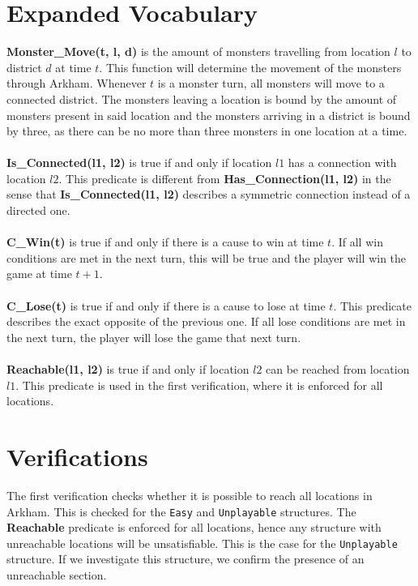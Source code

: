 \documentclass[12pt]{report}
\begin{document}
\section*{Expanded Vocabulary}
\textbf{Monster\_Move(t, l, d)} is the amount of monsters travelling from location $l$ to district $d$ at time $t$. This function will determine the movement of the monsters through Arkham. Whenever $t$ is a monster turn, all monsters will move to a connected district. The monsters leaving a location is bound by the amount of monsters present in said location and the monsters arriving in a district is bound by three, as there can be no more than three monsters in one location at a time.
\\\\
\textbf{Is\_Connected(l1, l2)} is true if and only if location $l1$ has a connection with location $l2$. This predicate is different from \textbf{Has\_Connection(l1, l2)} in the sense that \textbf{Is\_Connected(l1, l2)} describes a symmetric connection instead of a directed one.
\\\\
\textbf{C\_Win(t)} is true if and only if there is a cause to win at time $t$. If all win conditions are met in the next turn, this will be true and the player will win the game at time $t+1$.
\\\\
\textbf{C\_Lose(t)} is true if and only if there is a cause to lose at time $t$. This predicate describes the exact opposite of the previous one. If all lose conditions are met in the next turn, the player will lose the game that next turn.
\\\\
\textbf{Reachable(l1, l2)} is true if and only if location $l2$ can be reached from location $l1$. This predicate is used in the first verification, where it is enforced for all locations.

\section*{Verifications}\label{sec:verifications}
The first verification checks whether it is possible to reach all locations in Arkham. This is checked for the \texttt{Easy} and \texttt{Unplayable} structures. The \textbf{Reachable} predicate is enforced for all locations, hence any structure with unreachable locations will be unsatisfiable. This is the case for the \texttt{Unplayable} structure. If we investigate this structure, we confirm the presence of an unreachable section.
\end{document}
